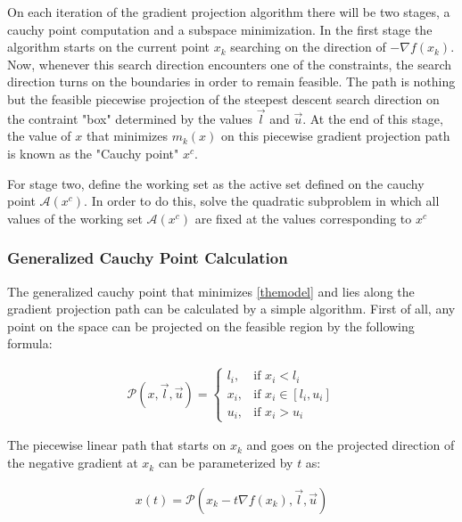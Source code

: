 On each iteration of the gradient projection algorithm there will be two stages, a cauchy point computation and a subspace minimization.  In the first stage the algorithm starts on the current point $x_k$ searching on the direction of $-\nabla f(x_k)$.  Now, whenever this search direction encounters one of the constraints, the search direction turns on the boundaries in order to remain feasible.  The path is nothing but the feasible piecewise projection of the steepest descent search direction on the contraint "box" determined by the values $\overrightarrow{l}$ and $\overrightarrow{u}$.  At the end of this stage, the value of $x$ that minimizes $m_k(x)$ on this piecewise gradient projection path is known as the "Cauchy point" $x^c$.

For stage two, define the working set as the active set defined on the cauchy point $\mathcal{A}(x^c)$.  In order to do this, solve the quadratic subproblem in which all values of the working set $\mathcal{A}(x^c)$ are fixed at the values corresponding to $x^c$

\subsubsection{Generalized Cauchy Point Calculation}

The generalized cauchy point that minimizes \ref{themodel} and lies along the gradient projection path can be calculated by a simple algorithm.  First of all, any point on the space can be projected on the feasible region by the following formula: 

\begin{equation}
  \begin{aligned}
    \mathcal{P}(x, \vec{l}, \vec{u}) = 
    \begin{cases}
      l_i, & \text{if } x_i < l_i \\
      x_i, & \text{if } x_i \in [l_i, u_i] \\
      u_i, & \text{if } x_i > u_i
    \end{cases}
  \end{aligned}
\end{equation}

The piecewise linear path that starts on $x_k$ and goes on the projected direction of the negative gradient at $x_k$ can be parameterized by $t$ as:

\begin{equation}
  \begin{aligned}
    x(t) = \mathcal{P}(x_k - t \nabla f(x_k), \vec{l}, \vec{u})
  \end{aligned}
\end{equation}

